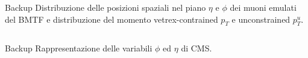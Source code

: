 \documentclass{beamer}
\begin{document}
\begin{frame}{Backup}
    Distribuzione delle posizioni spaziali nel piano $\eta$ e $\phi$ dei muoni emulati del BMTF e distribuzione del momento vetrex-contrained $p_T$ e unconstrained $p_T^u$.

    \vspace{0.5cm}
\begin{columns}

    \begin{column}{0.5\textwidth}
    \end{column}
    \begin{column}{0.5\textwidth}
        
    \end{column}
\end{columns}
\end{frame}



\begin{frame}{Backup}
    Rappresentazione delle variabili $\phi$ ed $\eta$ di CMS.

    \vspace{0.5cm}
\begin{columns}

    \begin{column}{0.4\textwidth}
    \end{column}
    \begin{column}{0.65\textwidth}
        
    \end{column}
\end{columns}
\end{frame}





    
    
\end{document}
